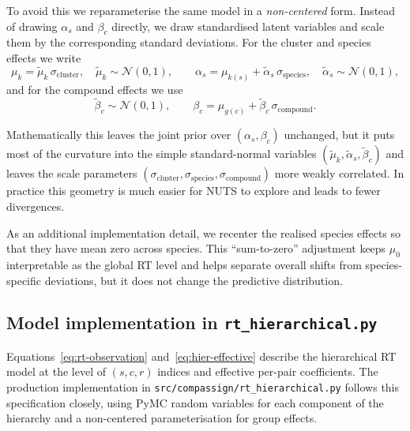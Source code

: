 \documentclass[11pt]{article}
\begin{document}
To avoid this we reparameterise the same model in a \emph{non-centered} form. Instead
of drawing $\alpha_s$ and $\beta_c$ directly, we draw standardised latent variables and
scale them by the corresponding standard deviations. For the cluster and species
effects we write
\begin{equation}
  \mu_k=\tilde{\mu}_k\,\sigma_{\mathrm{cluster}},
  \quad
  \tilde{\mu}_k\sim\mathcal{N}(0,1),
  \qquad
  \alpha_s=\mu_{k(s)}+\tilde{\alpha}_s\,\sigma_{\mathrm{species}},
  \quad
  \tilde{\alpha}_s\sim\mathcal{N}(0,1),
\end{equation}
and for the compound effects we use
\begin{equation}
  \tilde{\beta}_c\sim\mathcal{N}(0,1),
  \qquad
  \beta_c=\mu_{g(c)}+\tilde{\beta}_c\,\sigma_{\mathrm{compound}}.
\end{equation}

Mathematically this leaves the joint prior over $(\alpha_s,\beta_c)$ unchanged, but it
puts most of the curvature into the simple standard-normal variables
$(\tilde{\mu}_k,\tilde{\alpha}_s,\tilde{\beta}_c)$ and leaves the scale parameters
$(\sigma_{\mathrm{cluster}},\sigma_{\mathrm{species}},\sigma_{\mathrm{compound}})$ more
weakly correlated. In practice this geometry is much easier for NUTS to explore and
leads to fewer divergences.

As an additional implementation detail, we recenter the realised species effects so
that they have mean zero across species. This ``sum-to-zero'' adjustment keeps $\mu_0$
interpretable as the global RT level and helps separate overall shifts from
species-specific deviations, but it does not change the predictive distribution.

\subsection{Model implementation in \texttt{rt\_hierarchical.py}}

Equations~\eqref{eq:rt-observation} and~\eqref{eq:hier-effective} describe the
hierarchical RT model at the level of $(s,c,r)$ indices and effective per-pair
coefficients. The production implementation in
\texttt{src/compassign/rt\_hierarchical.py} follows this specification closely, using
PyMC random variables for each component of the hierarchy and a non-centered
parameterisation for group effects.
\end{document}
